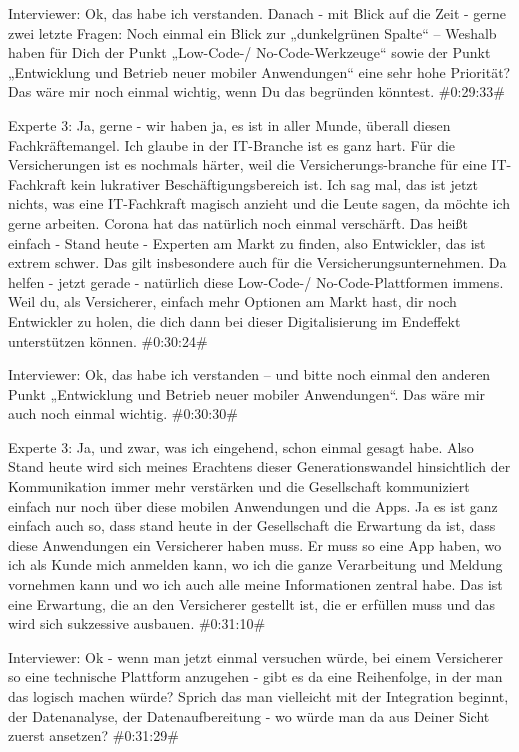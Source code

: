 Interviewer:
Ok, das habe ich verstanden. Danach - mit Blick auf die Zeit - gerne zwei letzte Fragen: Noch einmal ein Blick zur „dunkelgrünen Spalte“ – Weshalb haben für Dich der Punkt „Low-Code-/ No-Code-Werkzeuge“ sowie der Punkt „Entwicklung und Betrieb neuer mobiler Anwendungen“ eine sehr hohe Priorität? Das wäre mir noch einmal wichtig, wenn Du das begründen könntest.
\#0:29:33\#

Experte 3:
Ja, gerne - wir haben ja, es ist in aller Munde, überall diesen Fachkräftemangel. Ich glaube in der IT-Branche ist es ganz hart. Für die Versicherungen ist es nochmals härter, weil die Versicherungs-branche für eine IT-Fachkraft kein lukrativer Beschäftigungsbereich ist. Ich sag mal, das ist jetzt nichts, was eine IT-Fachkraft magisch anzieht und die Leute sagen, da möchte ich gerne arbeiten. Corona hat das natürlich noch einmal verschärft. Das heißt einfach - Stand heute - Experten am Markt zu finden, also Entwickler, das ist extrem schwer. Das gilt insbesondere auch für die Versicherungsunternehmen. Da helfen - jetzt gerade - natürlich diese Low-Code-/ No-Code-Plattformen immens. Weil du, als Versicherer, einfach mehr Optionen am Markt hast, dir noch Entwickler zu holen, die dich dann bei dieser Digitalisierung im Endeffekt unterstützen können.
\#0:30:24\#

Interviewer:
Ok, das habe ich verstanden – und bitte noch einmal den anderen Punkt „Entwicklung und Betrieb neuer mobiler Anwendungen“. Das wäre mir auch noch einmal wichtig.
\#0:30:30\#

Experte 3:
Ja, und zwar, was ich eingehend, schon einmal gesagt habe. Also Stand heute wird sich meines Erachtens dieser Generationswandel hinsichtlich der Kommunikation immer mehr verstärken und die Gesellschaft kommuniziert einfach nur noch über diese mobilen Anwendungen und die Apps. Ja es ist ganz einfach auch so, dass stand heute in der Gesellschaft die Erwartung da ist, dass diese Anwendungen ein Versicherer haben muss. Er muss so eine App haben, wo ich als Kunde mich anmelden kann, wo ich die ganze Verarbeitung und Meldung vornehmen kann und wo ich auch alle meine Informationen zentral habe. Das ist eine Erwartung, die an den Versicherer gestellt ist, die er erfüllen muss und das wird sich sukzessive ausbauen.
\#0:31:10\#

Interviewer:
Ok - wenn man jetzt einmal versuchen würde, bei einem Versicherer so eine technische Plattform anzugehen - gibt es da eine Reihenfolge, in der man das logisch machen würde? Sprich das man vielleicht mit der Integration beginnt, der Datenanalyse, der Datenaufbereitung - wo würde man da aus Deiner Sicht zuerst ansetzen?
\#0:31:29\#

